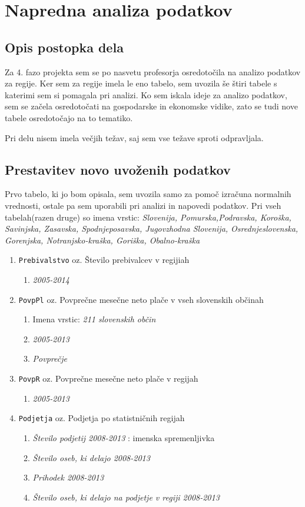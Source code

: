 \documentclass[11pt,a4paper]{article}
\begin{document}
\section{Napredna analiza podatkov}
\subsection{Opis postopka dela}
Za 4. fazo projekta sem se po nasvetu profesorja osredotočila na analizo podatkov za regije. Ker sem za regije imela le eno tabelo, sem uvozila še štiri tabele s katerimi sem si pomagala pri analizi. Ko sem iskala ideje za analizo podatkov, sem se začela osredotočati na gospodarske in ekonomske vidike, zato se tudi nove tabele osredotočajo na to tematiko.

Pri delu nisem imela večjih težav, saj sem vse težave sproti odpravljala.
\subsection{Prestavitev novo uvoženih podatkov}
Prvo tabelo, ki jo bom opisala, sem uvozila samo za pomoč izračuna normalnih vrednosti, ostale pa sem uporabili pri analizi in napovedi podatkov. Pri vseh tabelah(razen druge) so imena vrstic: \textit{Slovenija, Pomurska,Podravska, Koroška, Savinjska, Zasavska, Spodnjeposavska, Jugovzhodna Slovenija, Osrednjeslovenska, Gorenjska, Notranjsko-kraška, Goriška, Obalno-kraška}
\begin{enumerate}
\item \verb+Prebivalstvo+ oz. Število prebivalcev v regijiah
\begin{enumerate}
\item \textit{2005-2014}
\end{enumerate}
\item \verb+PovpPl+ oz. Povprečne mesečne neto plače v vseh slovenskih občinah
\begin{enumerate}
\item Imena vrstic: \textit{211 slovenskih občin}
\item \textit{2005-2013} 
\item \textit{Povprečje} 
\end{enumerate}
\item \verb+PovpR+ oz. Povprečne mesečne neto plače v regijah
\begin{enumerate}
\item \textit{2005-2013} 
\end{enumerate}
\item \verb+Podjetja+ oz. Podjetja po statistničnih regijah
\begin{enumerate}
\item \textit{Število podjetij 2008-2013} : imenska spremenljivka
\item \textit{Število oseb, ki delajo 2008-2013} 
\item \textit{Prihodek 2008-2013} 
\item \textit{Število oseb, ki delajo na podjetje v regiji 2008-2013} 
\end{enumerate}
\end{enumerate}
\end{document}
